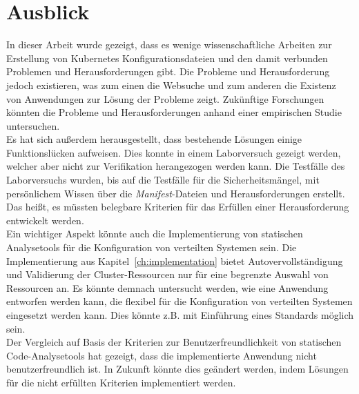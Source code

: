 \section{Ausblick}

In dieser Arbeit wurde gezeigt, dass es wenige wissenschaftliche Arbeiten zur Erstellung von
Kubernetes Konfigurationsdateien und den damit verbunden Problemen und Herausforderungen gibt.
Die Probleme und Herausforderung jedoch existieren, was zum einen die Websuche und zum anderen die
Existenz von Anwendungen zur Lösung der Probleme zeigt. Zukünftige Forschungen könnten die Probleme und Herausforderungen
anhand einer empirischen Studie untersuchen.
\\
Es hat sich außerdem herausgestellt, dass bestehende Lösungen einige Funktionslücken aufweisen.
Dies konnte in einem Laborversuch gezeigt werden, welcher aber nicht zur Verifikation herangezogen werden kann.
Die Testfälle des Laborversuchs wurden, bis auf die Testfälle für die Sicherheitsmängel,
mit persönlichem Wissen über die \textit{Manifest}-Dateien und Herausforderungen erstellt.
Das heißt, es müssten belegbare Kriterien für das Erfüllen einer Herausforderung entwickelt werden.
\\
Ein wichtiger Aspekt könnte auch die Implementierung von statischen Analysetools für die Konfiguration von
verteilten Systemen sein. Die Implementierung aus Kapitel~\ref{ch:implementation} bietet Autovervollständigung und Validierung
der Cluster-Ressourcen nur für eine begrenzte Auswahl von Ressourcen an. Es könnte demnach untersucht werden,
wie eine Anwendung entworfen werden kann, die flexibel für die Konfiguration von verteilten Systemen eingesetzt werden kann.
Dies könnte z.B. mit Einführung eines Standards möglich sein.
\\
Der Vergleich auf Basis der Kriterien zur Benutzerfreundlichkeit von statischen Code-Analysetools hat gezeigt,
dass die implementierte Anwendung nicht benutzerfreundlich ist.
In Zukunft könnte dies geändert werden, indem Lösungen für die nicht erfüllten Kriterien implementiert werden.
